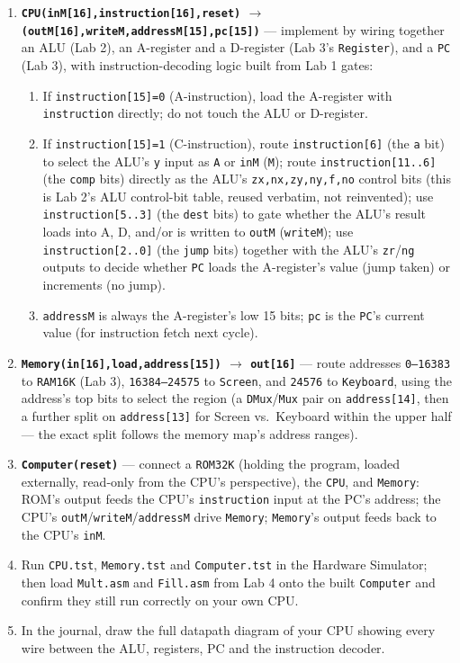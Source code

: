 \documentclass[11pt]{article}
\begin{document}
\begin{enumerate}
  \item \textbf{\texttt{CPU(inM[16],instruction[16],reset)} $\to$ \texttt{(outM[16],writeM,addressM[15],pc[15])}} --- implement by wiring together an ALU (Lab 2), an A-register and a D-register (Lab 3's \texttt{Register}), and a \texttt{PC} (Lab 3), with instruction-decoding logic built from Lab 1 gates:
  \begin{enumerate}
    \item If \texttt{instruction[15]=0} (A-instruction), load the A-register with \texttt{instruction} directly; do not touch the ALU or D-register.
    \item If \texttt{instruction[15]=1} (C-instruction), route \texttt{instruction[6]} (the \texttt{a} bit) to select the ALU's \texttt{y} input as \texttt{A} or \texttt{inM} (\texttt{M}); route \texttt{instruction[11..6]} (the \texttt{comp} bits) directly as the ALU's \texttt{zx,nx,zy,ny,f,no} control bits (this is Lab 2's ALU control-bit table, reused verbatim, not reinvented); use \texttt{instruction[5..3]} (the \texttt{dest} bits) to gate whether the ALU's result loads into A, D, and/or is written to \texttt{outM} (\texttt{writeM}); use \texttt{instruction[2..0]} (the \texttt{jump} bits) together with the ALU's \texttt{zr}/\texttt{ng} outputs to decide whether \texttt{PC} loads the A-register's value (jump taken) or increments (no jump).
    \item \texttt{addressM} is always the A-register's low 15 bits; \texttt{pc} is the \texttt{PC}'s current value (for instruction fetch next cycle).
  \end{enumerate}
  \item \textbf{\texttt{Memory(in[16],load,address[15])} $\to$ \texttt{out[16]}} --- route addresses \texttt{0--16383} to \texttt{RAM16K} (Lab 3), \texttt{16384--24575} to \texttt{Screen}, and \texttt{24576} to \texttt{Keyboard}, using the address's top bits to select the region (a \texttt{DMux}/\texttt{Mux} pair on \texttt{address[14]}, then a further split on \texttt{address[13]} for Screen vs.\ Keyboard within the upper half --- the exact split follows the memory map's address ranges).
  \item \textbf{\texttt{Computer(reset)}} --- connect a \texttt{ROM32K} (holding the program, loaded externally, read-only from the CPU's perspective), the \texttt{CPU}, and \texttt{Memory}: ROM's output feeds the CPU's \texttt{instruction} input at the PC's address; the CPU's \texttt{outM}/\texttt{writeM}/\texttt{addressM} drive \texttt{Memory}; \texttt{Memory}'s output feeds back to the CPU's \texttt{inM}.
  \item Run \texttt{CPU.tst}, \texttt{Memory.tst} and \texttt{Computer.tst} in the Hardware Simulator; then load \texttt{Mult.asm} and \texttt{Fill.asm} from Lab 4 onto the built \texttt{Computer} and confirm they still run correctly on your own CPU.
  \item In the journal, draw the full datapath diagram of your CPU showing every wire between the ALU, registers, PC and the instruction decoder.
\end{enumerate}
\end{document}
